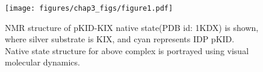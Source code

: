 \documentclass[../talant.diss.submit.tex]{subfiles}
\begin{document}
%
%
%
\begin{figure}[htp!]
  \begin{centering}
    \texttt{[image: figures/chap3\_figs/figure1.pdf]}
    \caption{NMR structure of pKID-KIX native state(PDB id: 1KDX) is
      shown, where silver substrate is KIX, and cyan represents IDP
      pKID. Native state structure for above complex is portrayed using
      visual molecular dynamics. ~\cite{Humphrey:96}}
    \label{fig:figure1}
  \end{centering}
\end{figure}
%
%
\end{document}
